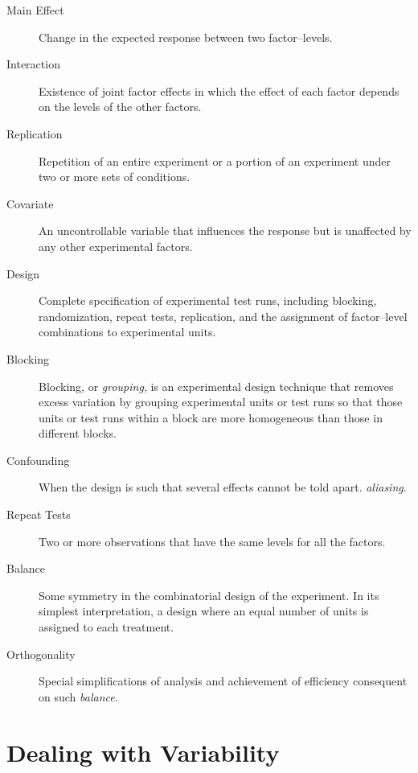 \begin{description}
\item [Main Effect] Change in the expected response between two factor–levels.  

\item [Interaction] Existence of joint factor effects in which the effect of each factor depends on the levels of the other factors.

\item [Replication] Repetition of an entire experiment or a portion of an experiment under two or more sets of conditions.

\item [Covariate]  An uncontrollable variable that influences the response but is
unaffected by any other experimental factors.

\item [Design]  Complete specification of experimental test runs, including blocking, randomization, repeat tests, replication, and the assignment of factor–level combinations to experimental units.

\item [Blocking]  Blocking, or \emph{grouping}, is an experimental design technique that removes excess variation by grouping experimental units or test runs so that those units or test runs within a block are more homogeneous than those in different blocks.

\item [Confounding] When the design is such that several effects cannot be told apart. \Aka \emph{aliasing}.

\item [Repeat Tests] Two or more observations that have the same levels for all the factors.

\item [Balance] Some symmetry in the combinatorial design of the experiment. In its simplest interpretation, a design where an equal number of units is assigned to each treatment.

\item [Orthogonality]  Special simplifications of analysis and achievement of efficiency consequent on such \emph{balance}.
\end{description}








\section{Dealing with Variability}
\label{sec:variance_components}

